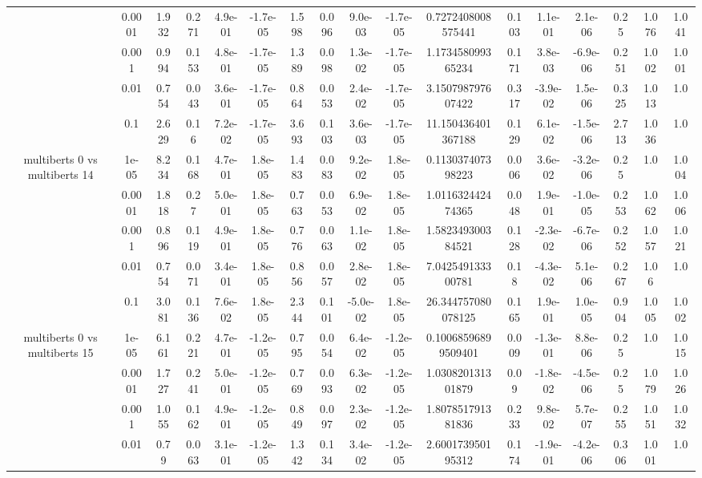\begin{tabular}{|c|c|c|c|c|c|c|c|c|c|c|c|c|c|c|c|c|}
 & 0.0001 & 1.932 & 0.271 & 4.9e-01 & -1.7e-05 & 1.598 & 0.096 & 9.0e-03 & -1.7e-05 & 0.7272408008575441 & 0.103 & 1.1e-01 & 2.1e-06 & 0.25 & 1.076 & 1.041 \\
 & 0.001 & 0.994 & 0.153 & 4.8e-01 & -1.7e-05 & 1.389 & 0.098 & 1.3e-02 & -1.7e-05 & 1.173458099365234 & 0.171 & 3.8e-03 & -6.9e-06 & 0.251 & 1.002 & 1.001 \\
 & 0.01 & 0.754 & 0.043 & 3.6e-01 & -1.7e-05 & 0.864 & 0.053 & 2.4e-02 & -1.7e-05 & 3.150798797607422 & 0.317 & -3.9e-02 & 1.5e-06 & 0.325 & 1.013 & 1.0 \\
 & 0.1 & 2.629 & 0.16 & 7.2e-02 & -1.7e-05 & 3.693 & 0.103 & 3.6e-03 & -1.7e-05 & 11.150436401367188 & 0.129 & 6.1e-02 & -1.5e-06 & 2.713 & 1.036 & 1.0 \\
\hline
\multirow{5}{*}{multiberts 0 vs multiberts 14} & 1e-05 & 8.234 & 0.168 & 4.7e-01 & 1.8e-05 & 1.483 & 0.083 & 9.2e-02 & 1.8e-05 & 0.113037407398223 & 0.006 & 3.6e-02 & -3.2e-06 & 0.25 & 1.0 & 1.004 \\
 & 0.0001 & 1.818 & 0.27 & 5.0e-01 & 1.8e-05 & 0.763 & 0.053 & 6.9e-02 & 1.8e-05 & 1.011632442474365 & 0.048 & 1.9e-01 & -1.0e-05 & 0.253 & 1.062 & 1.006 \\
 & 0.001 & 0.896 & 0.119 & 4.9e-01 & 1.8e-05 & 0.776 & 0.063 & 1.1e-02 & 1.8e-05 & 1.582349300384521 & 0.128 & -2.3e-02 & -6.7e-06 & 0.252 & 1.057 & 1.021 \\
 & 0.01 & 0.754 & 0.071 & 3.4e-01 & 1.8e-05 & 0.856 & 0.057 & 2.8e-02 & 1.8e-05 & 7.042549133300781 & 0.18 & -4.3e-02 & 5.1e-06 & 0.267 & 1.06 & 1.0 \\
 & 0.1 & 3.081 & 0.136 & 7.6e-02 & 1.8e-05 & 2.344 & 0.101 & -5.0e-02 & 1.8e-05 & 26.344757080078125 & 0.165 & 1.9e-01 & 1.0e-05 & 0.904 & 1.005 & 1.002 \\
\hline
\multirow{5}{*}{multiberts 0 vs multiberts 15} & 1e-05 & 6.161 & 0.221 & 4.7e-01 & -1.2e-05 & 0.795 & 0.054 & 6.4e-02 & -1.2e-05 & 0.10068596899509401 & 0.009 & -1.3e-01 & 8.8e-06 & 0.25 & 1.0 & 1.015 \\
 & 0.0001 & 1.727 & 0.241 & 5.0e-01 & -1.2e-05 & 0.769 & 0.093 & 6.3e-02 & -1.2e-05 & 1.030820131301879 & 0.09 & -1.8e-02 & -4.5e-06 & 0.25 & 1.079 & 1.026 \\
 & 0.001 & 1.055 & 0.162 & 4.9e-01 & -1.2e-05 & 0.849 & 0.097 & 2.3e-02 & -1.2e-05 & 1.807851791381836 & 0.233 & 9.8e-02 & 5.7e-07 & 0.255 & 1.051 & 1.032 \\
 & 0.01 & 0.79 & 0.063 & 3.1e-01 & -1.2e-05 & 1.342 & 0.134 & 3.4e-02 & -1.2e-05 & 2.600173950195312 & 0.174 & -1.9e-01 & -4.2e-06 & 0.306 & 1.001 & 1.0 \\

\end{tabular}
